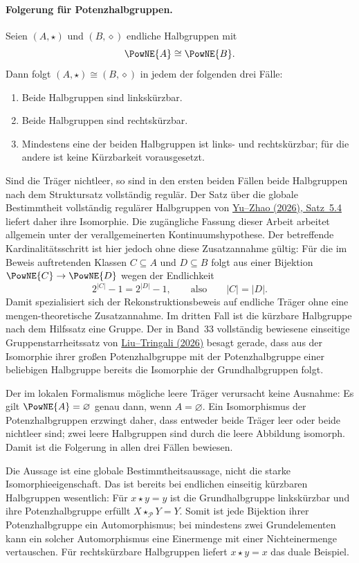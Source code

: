 \documentclass[main.tex]{subfiles}
\begin{document}
\paragraph{Folgerung für Potenzhalbgruppen.}
Seien \((A,\star)\) und \((B,\diamond)\) endliche Halbgruppen mit
\[
  \PowNE{A}\cong\PowNE{B}.
\]
Dann folgt \((A,\star)\cong(B,\diamond)\) in jedem der folgenden drei
Fälle:
\begin{enumerate}
  \item Beide Halbgruppen sind linkskürzbar.
  \item Beide Halbgruppen sind rechtskürzbar.
  \item Mindestens eine der beiden Halbgruppen ist links- und
    rechtskürzbar; für die andere ist keine Kürzbarkeit vorausgesetzt.
\end{enumerate}

Sind die Träger nichtleer, so sind in den ersten beiden Fällen beide
Halbgruppen nach dem Struktursatz vollständig regulär.  Der Satz über die
globale Bestimmtheit vollständig regulärer Halbgruppen von
\href{https://doi.org/10.1080/00927872.2026.2659846}%
  {Yu--Zhao (2026), Satz~5.4}
liefert daher ihre Isomorphie.  Die zugängliche Fassung dieser Arbeit arbeitet
allgemein unter der verallgemeinerten Kontinuumshypothese.  Der betreffende
Kardinalitätsschritt ist hier jedoch ohne diese Zusatzannahme gültig: Für die
im Beweis auftretenden Klassen
\(C\subseteq A\) und \(D\subseteq B\) folgt aus einer Bijektion
\(\PowNE{C}\to\PowNE{D}\) wegen der Endlichkeit
\[
  2^{|C|}-1=2^{|D|}-1,
  \qquad\text{also}\qquad
  |C|=|D|.
\]
Damit spezialisiert sich der Rekonstruktionsbeweis auf endliche Träger ohne
eine mengen-theoretische Zusatzannahme.  Im dritten Fall ist die kürzbare
Halbgruppe nach dem Hilfssatz eine Gruppe.  Der in Band~33 vollständig
bewiesene einseitige Gruppenstarrheitssatz von
\href{https://doi.org/10.48550/arXiv.2606.01917}%
  {Liu--Tringali (2026)}
besagt gerade, dass aus der Isomorphie ihrer großen Potenzhalbgruppe mit der
Potenzhalbgruppe einer beliebigen Halbgruppe bereits die Isomorphie der
Grundhalbgruppen folgt.

Der im lokalen Formalismus mögliche leere Träger verursacht keine Ausnahme:
Es gilt \(\PowNE{A}=\varnothing\) genau dann, wenn \(A=\varnothing\).  Ein
Isomorphismus der Potenzhalbgruppen erzwingt daher, dass entweder beide
Träger leer oder beide nichtleer sind; zwei leere Halbgruppen sind durch die
leere Abbildung isomorph.  Damit ist die Folgerung in allen drei Fällen
bewiesen.

Die Aussage ist eine globale Bestimmtheitsaussage, nicht die starke
Isomorphieeigenschaft.  Das ist bereits bei endlichen einseitig kürzbaren
Halbgruppen wesentlich: Für \(x\star y=y\) ist die Grundhalbgruppe
linkskürzbar und ihre Potenzhalbgruppe erfüllt \(X\star_{\mathcal P}Y=Y\).
Somit ist jede Bijektion ihrer Potenzhalbgruppe ein Automorphismus; bei
mindestens zwei Grundelementen kann ein solcher Automorphismus eine
Einermenge mit einer Nichteinermenge vertauschen.  Für rechtskürzbare
Halbgruppen liefert \(x\star y=x\) das duale Beispiel.
\end{document}
